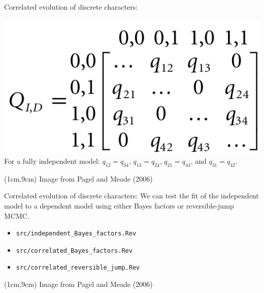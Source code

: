 \documentclass[mathserif]{beamer}
\begin{document}
\begin{frame}[fragile]
    \begin{block}{Correlated evolution of discrete characters:}
    \bigskip
    \begin{center}
    \includegraphics[scale=0.15]{figures/pagel2.png}\\
        \bigskip
        \bigskip
        For a fully independent model:
        $q_{12} = q_{34}$, 
        $q_{13} = q_{24}$, 
        $q_{21} = q_{43}$, and 
        $q_{31} = q_{42}$. 
    \end{center}
    \end{block}
    \begin{textblock*}{10cm}(1cm,9cm)
    \tiny Image from Pagel and Meade (2006)
    \end{textblock*}
\end{frame}


\begin{frame}[fragile]
    \begin{block}{Correlated evolution of discrete characters:}
    \bigskip
        We can test the fit of the independent model to a dependent model
        using either \alert{Bayes factors} or \alert{reversible-jump MCMC}.\\
    \bigskip
        \begin{itemize}
           \item \texttt{src/independent\_Bayes\_factors.Rev}
           \item \texttt{src/correlated\_Bayes\_factors.Rev}
           \item \texttt{src/correlated\_reversible\_jump.Rev}
        \end{itemize}
    \end{block}
    \begin{textblock*}{10cm}(1cm,9cm)
    \tiny Image from Pagel and Meade (2006)
    \end{textblock*}
\end{frame}
\end{document}
